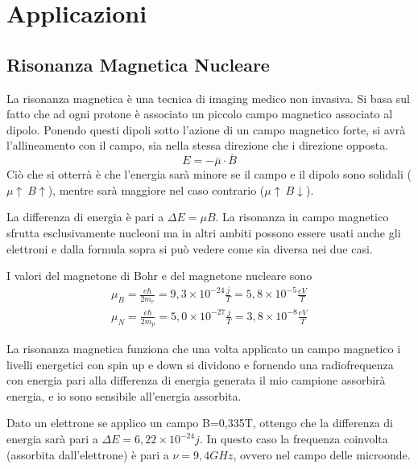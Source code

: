 
\section{Applicazioni}
\subsection{Risonanza Magnetica Nucleare}
La risonanza magnetica è una tecnica di imaging medico non invasiva.
Si basa sul fatto che ad ogni protone è associato un piccolo campo magnetico associato al dipolo. 
Ponendo questi dipoli sotto l'azione di un campo magnetico forte, si avrà l'allineamento con il campo, sia nella stessa direzione che i direzione opposta.
\begin{equation}
E=-\bar \mu\cdot \bar B
\end{equation}
Ciò che si otterrà è che l'energia sarà minore se il campo e il dipolo sono solidali ($\mu\uparrow\  B\uparrow$), mentre sarà maggiore nel caso contrario ($\mu\uparrow\  B\downarrow$).
\begin{figure}

\end{figure}
La differenza di energia è pari a $\Delta E=\mu B$.
La risonanza in campo magnetico sfrutta esclusivamente nucleoni ma in altri ambiti possono essere usati anche gli elettroni e dalla formula sopra si può vedere come sia diversa nei due casi.

I valori del magnetone di Bohr e del magnetone nucleare sono 
\begin{equation}
\begin{split}
\mu_B=\frac{e\hbar}{2m_e}=9,3\times10^{-24}\frac{j}{T}=5,8\times10^{-5}\frac{eV}{T}\\
\mu_N=\frac{e\hbar}{2m_p}=5,0\times10^{-27}\frac{j}{T}=3,8\times10^{-8}\frac{eV}{T}
\end{split}
\end{equation}

La risonanza magnetica funziona che una volta applicato un campo magnetico i livelli energetici con spin up e down si dividono e fornendo una radiofrequenza con energia pari alla differenza di energia generata il mio campione assorbirà energia, e io sono sensibile all'energia assorbita. 

Dato un elettrone se applico un campo B=0,335T, ottengo che la differenza di energia sarà pari a $\Delta E=6,22\times 10^{-24}j$.
In questo caso la frequenza coinvolta (assorbita dall'elettrone) è pari a $\nu =9,4GHz$, ovvero nel campo delle microonde.


